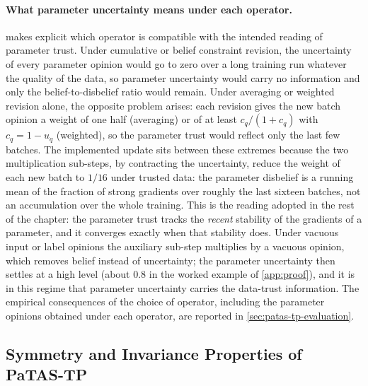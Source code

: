 \paragraph*{What parameter uncertainty means under each operator.}  makes explicit which operator is compatible with the intended reading of parameter trust. Under cumulative or belief constraint revision, the uncertainty of every parameter opinion would go to zero over a long training run whatever the quality of the data, so parameter uncertainty would carry no information and only the belief-to-disbelief ratio would remain. Under averaging or weighted revision alone, the opposite problem arises: each revision gives the new batch opinion a weight of one half (averaging) or of at least $c_q/(1 + c_q)$ with $c_q = 1 - u_q$ (weighted), so the parameter trust would reflect only the last few batches. The implemented update sits between these extremes because the two multiplication sub-steps, by contracting the uncertainty, reduce the weight of each new batch to $1/16$ under trusted data: the parameter disbelief is a running mean of the fraction of strong gradients over roughly the last sixteen batches, not an accumulation over the whole training. This is the reading adopted in the rest of the chapter: the parameter trust tracks the \emph{recent} stability of the gradients of a parameter, and it converges exactly when that stability does. Under vacuous input or label opinions the auxiliary sub-step multiplies by a vacuous opinion, which removes belief instead of uncertainty; the parameter uncertainty then settles at a high level (about $0.8$ in the worked example of \cref{app:proof}), and it is in this regime that parameter uncertainty carries the data-trust information. The empirical consequences of the choice of operator, including the parameter opinions obtained under each operator, are reported in \cref{sec:patas-tp-evaluation}.


\subsection{Symmetry and Invariance Properties of \ac{PaTAS-TP}}\label{sec:ptassyminv}

